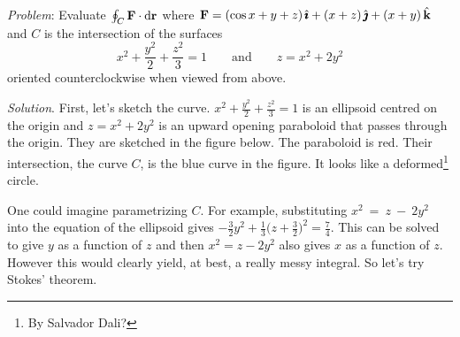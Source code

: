 \begin{eg}\label{eg:stokesC}
\noindent\textit{Problem}:
Evaluate
$
\oint_C\mathbf{F}\cdot\mathrm{d}\mathbf{r}
$
where $\mathbf{F}= (\cos x +y+z)\,\hat{\pmb{\imath}}+(x+z)\,\hat{\pmb{\jmath}} +(x+y)\,\hat{\mathbf{k}}$ 
and $C$ is the intersection of the surfaces
\begin{equation*}
x^2+\frac{y^2}{2}+\frac{z^2}{3}=1\qquad\text{and}\qquad z=x^2+2y^2
\end{equation*}
oriented counterclockwise when viewed from above.

\medskip
\noindent\textit{Solution}. First, let's sketch the curve.
$x^2+\frac{y^2}{2}+\frac{z^2}{3}=1$ is an ellipsoid centred on the
origin and $z=x^2+2y^2$ is an upward opening paraboloid that passes
through the origin. They are sketched in the figure below. 
The paraboloid is red.
Their intersection, the curve $C$, is the blue curve in the figure. 
It looks like a deformed\footnote{By Salvador Dali?} circle. 

One could imagine parametrizing $C$. For example, substituting
$x^2~=~z~-~2y^2$ into the equation of the ellipsoid gives 
$-\frac{3}{2}y^2 + \frac{1}{3}(z+\frac{3}{2}\big)^2 = \frac{7}{4}$.
This can be solved to give $y$ as a function of $z$ and then 
$x^2=z-2y^2$ also gives $x$ as a function of $z$. However this would 
clearly yield, at best, a really messy integral. So let's try
Stokes' theorem.


\end{eg}
